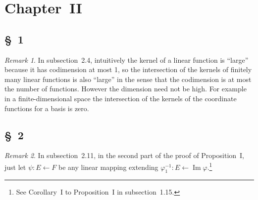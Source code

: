 \documentclass[letterpaper,12pt]{article}
\newcommand{\from}{\leftarrow}
\DeclareMathOperator{\im}{Im}
\theoremstyle{definition}
\theoremstyle{remark}
\newtheorem*{rmk}{Remark}
\begin{document}
\section*{Chapter~II}
\subsection*{\S~1}
\begin{rmk}
In subsection~2.4, intuitively the kernel of a linear function is ``large'' because it has codimension at most 1, so the intersection of the kernels of finitely many linear functions is also ``large'' in the sense that the codimension is at most the number of functions. However the dimension need not be high. For example in a finite-dimensional space the intersection of the kernels of the coordinate functions for a basis is zero.
\end{rmk}

\subsection*{\S~2}
\begin{rmk}
In subsection~2.11, in the second part of the proof of Proposition~I, just let \(\psi:E\from F\) be any linear mapping extending \(\varphi_1^{-1}:E\from\im\varphi\).\footnote{See Corollary~I to Proposition~I in subsection~1.15.}
\end{rmk}
\end{document}
